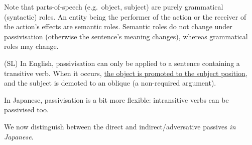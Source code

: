 \documentclass[../nihongo-gakushuu-kyouzai.tex]{subfiles}
\begin{document}
Note that parts-of-speech (e.g.\ object, subject) are purely grammatical (syntactic) roles. An entity being the performer of the action or the receiver of the action's effects are semantic roles. Semantic roles do not change under passivisation (otherwise the sentence's meaning changes), whereas grammatical roles may change.

(SL) In English, passivisation can only be applied to a sentence containing a transitive verb. When it occurs, \ul{the object is promoted to the subject position}, and the subject is demoted to an oblique (a non-required argument).

In Japanese, passivisation is a bit more flexible: intransitive verbs can be passivised too.

We now distinguish between the direct and indirect/adversative passives \emph{in Japanese}.
\end{document}
